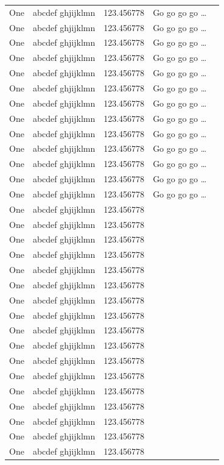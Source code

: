 \documentclass[phd]{ndsu-thesis-2022}
\begin{document}
\begin{longtable}{l l l l r}
One & abcdef ghjijklmn & 123.456778  & Go go go go \ldots \\
One & abcdef ghjijklmn & 123.456778  & Go go go go \ldots \\
One & abcdef ghjijklmn & 123.456778  & Go go go go \ldots \\
One & abcdef ghjijklmn & 123.456778  & Go go go go \ldots \\
One & abcdef ghjijklmn & 123.456778  & Go go go go \ldots \\
One & abcdef ghjijklmn & 123.456778  & Go go go go \ldots \\
One & abcdef ghjijklmn & 123.456778  & Go go go go \ldots \\
One & abcdef ghjijklmn & 123.456778  & Go go go go \ldots \\
One & abcdef ghjijklmn & 123.456778  & Go go go go \ldots \\
One & abcdef ghjijklmn & 123.456778  & Go go go go \ldots \\
One & abcdef ghjijklmn & 123.456778  & Go go go go \ldots \\
One & abcdef ghjijklmn & 123.456778  & Go go go go \ldots \\
One & abcdef ghjijklmn & 123.456778  & Go go go go \ldots \\
One & abcdef ghjijklmn & 123.456778 \\
One & abcdef ghjijklmn & 123.456778 \\
One & abcdef ghjijklmn & 123.456778 \\
One & abcdef ghjijklmn & 123.456778 \\
One & abcdef ghjijklmn & 123.456778 \\
One & abcdef ghjijklmn & 123.456778 \\
One & abcdef ghjijklmn & 123.456778 \\
One & abcdef ghjijklmn & 123.456778 \\
One & abcdef ghjijklmn & 123.456778 \\
One & abcdef ghjijklmn & 123.456778 \\
One & abcdef ghjijklmn & 123.456778 \\
One & abcdef ghjijklmn & 123.456778 \\
One & abcdef ghjijklmn & 123.456778 \\
One & abcdef ghjijklmn & 123.456778 \\
One & abcdef ghjijklmn & 123.456778 \\
One & abcdef ghjijklmn & 123.456778 \\
One & abcdef ghjijklmn & 123.456778 \\

\end{longtable}
\end{document}
